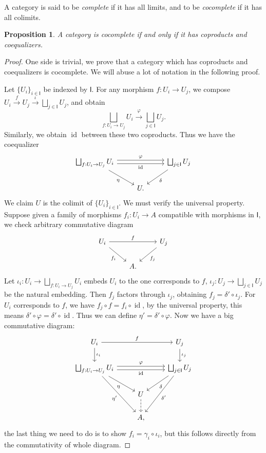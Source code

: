 \documentclass[a4paper]{amsart}
\theoremstyle{plain}
\newtheorem{prop}[thm]{Proposition}
\theoremstyle{definition}
\theoremstyle{remark}
\begin{document}
A category is said to be \emph{complete} if it has all limits, and to be \emph{cocomplete} if it has all colimits.
\begin{prop}
    A category is cocomplete if and only if it has coproducts and coequalizers.
\end{prop}
\begin{proof}
    One side is trivial, we prove that a category which has coproducts and coequalizers is cocomplete.
    We will abuse a lot of notation in the following proof.

    Let $\{U_i\}_{i\in\mathsf{I}}$ be indexed by $\mathsf{I}$.
    For any morphism $f:U_i\to U_j$, we compose $U_i\xrightarrow{f}U_j\xrightarrow{\iota}\bigsqcup_{j\in\mathsf{I}}U_j$, and obtain
    \[\bigsqcup_{f:U_i\to U_j}U_i\xrightarrow{\varphi}\bigsqcup_{j\in\mathsf{I}}U_j.\]
    Similarly, we obtain $\operatorname{id}$ between these two coproducts.
    Thus we have the coequalizer
    \[\begin{tikzcd}
        \bigsqcup_{f:U_i\to U_j}U_i \ar[rr, shift left, "\varphi"] \ar[rr, shift right, "{\operatorname{id}}"'] \ar[dr, "\eta"'] & & \bigsqcup_{j\in\mathsf{I}}U_j \ar[dl, "\delta"]\\
         & U. &
    \end{tikzcd}\]
    We claim $U$ is the colimit of $\{U_i\}_{i\in\mathsf{I}}$.
    We must verify the universal property.
    Suppose given a family of morphisms $f_i:U_i\to A$ compatible with morphisms in $\mathsf{I}$, we check arbitrary commutative diagram
    \[\begin{tikzcd}
        U_i \ar[rr, "f"] \ar[dr, "{f_i}"'] & & U_j \ar[dl, "{f_j}"] \\
         & A. &
    \end{tikzcd}\]
    Let $\iota_i:U_i\to\bigsqcup_{f:U_i\to U_j}U_i$ embeds $U_i$ to the one corresponds to $f$, $\iota_j:U_j\to\bigsqcup_{j\in\mathsf{I}}U_j$ be the natural embedding.
    Then $f_j$ factors through $\iota_j$, obtaining $f_j=\delta'\circ\iota_j$.
    For $U_i$ corresponds to $f$, we have $f_j\circ f=f_i\circ\operatorname{id}$, by the universal property, this means $\delta'\circ\varphi=\delta'\circ\operatorname{id}$.
    Thus we can define $\eta'=\delta'\circ\varphi$.
    Now we have a big commutative diagram:
    \[\begin{tikzcd}
        U_i \ar[rr, "f"] \ar[d, "{\iota_i}"] & & U_j \ar[d, "{\iota_j}"]\\
        \bigsqcup_{f:U_i\to U_j} U_i \ar[rr, shift left, "\varphi"] \ar[rr, shift right, "\operatorname{id}"'] \ar[dr, "\eta"'] \ar[ddr, "{\eta'}"'] & & \bigsqcup_{j\in\mathsf{I}}U_j \ar[dl, "\delta"] \ar[ddl, "\delta'"] \\
         & U \ar[d, dashed] & \\
         & A, &
    \end{tikzcd}\]
    the last thing we need to do is to show $f_i=\gamma_i\circ\iota_i$, but this follows directly from the commutativity of whole diagram.
\end{proof}
\end{document}
